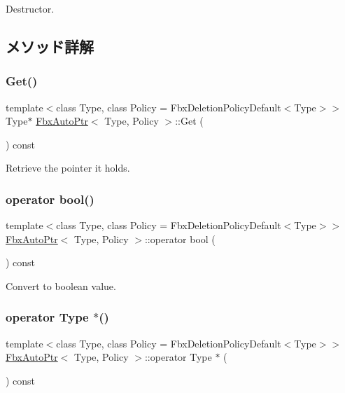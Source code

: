 Destructor. 



\subsection{メソッド詳解}
\mbox{\label{class_fbx_auto_ptr_ae7006aca39929990a12c7c99af5d3ef7}} 
\subsubsection{\texorpdfstring{Get()}{Get()}}
{\footnotesize\ttfamily template$<$class Type, class Policy = Fbx\+Deletion\+Policy\+Default$<$\+Type$>$$>$ \\
Type$\ast$ \hyperlink{class_fbx_auto_ptr}{Fbx\+Auto\+Ptr}$<$ Type, Policy $>$\+::Get (\begin{DoxyParamCaption}{ }\end{DoxyParamCaption}) const}



Retrieve the pointer it holds. 

\mbox{\label{class_fbx_auto_ptr_ae92a5d1428b0ce74491aab76f8535b4c}} 
\subsubsection{\texorpdfstring{operator bool()}{operator bool()}}
{\footnotesize\ttfamily template$<$class Type, class Policy = Fbx\+Deletion\+Policy\+Default$<$\+Type$>$$>$ \\
\hyperlink{class_fbx_auto_ptr}{Fbx\+Auto\+Ptr}$<$ Type, Policy $>$\+::operator bool (\begin{DoxyParamCaption}{ }\end{DoxyParamCaption}) const}



Convert to boolean value. 

\mbox{\label{class_fbx_auto_ptr_ab7d5ac9eadc5c51ea062016f08640be1}} 
\subsubsection{\texorpdfstring{operator Type $\ast$()}{operator Type *()}}
{\footnotesize\ttfamily template$<$class Type, class Policy = Fbx\+Deletion\+Policy\+Default$<$\+Type$>$$>$ \\
\hyperlink{class_fbx_auto_ptr}{Fbx\+Auto\+Ptr}$<$ Type, Policy $>$\+::operator Type $\ast$ (\begin{DoxyParamCaption}{ }\end{DoxyParamCaption}) const}



